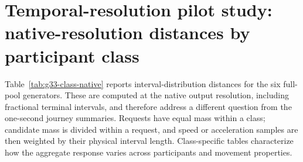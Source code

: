 \section{Temporal-resolution pilot study:\texorpdfstring{\\}{ }native-resolution distances by participant class}
Table~\ref{tab:g33-class-native} reports interval-distribution distances for the six full-pool generators. These are computed at the native output resolution, including fractional terminal intervals, and therefore address a different question from the one-second journey summaries. Requests have equal mass within a class; candidate mass is divided within a request, and speed or acceleration samples are then weighted by their physical interval length. Class-specific tables characterize how the aggregate response varies across participants and movement properties.

